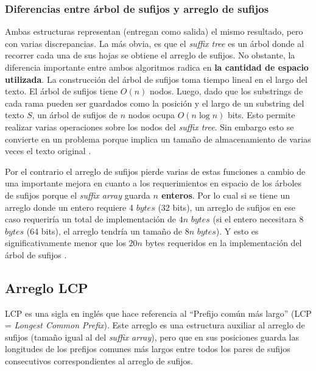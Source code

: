 \subsubsection*{Diferencias entre árbol de sufijos y arreglo de sufijos}

Ambas estructuras representan (entregan como salida) el mismo resultado, pero con varias discrepancias. La más obvia, es que el \textit{suffix tree} es un árbol donde al recorrer cada una de sus hojas se obtiene el arreglo de sufijos. No obstante, la diferencia importante entre ambos algoritmos radica en \textbf{la cantidad de espacio utilizada}. La construcción del árbol de sufijos toma tiempo lineal en el largo del texto. El árbol de sufijos tiene $O(n)$ nodos. Luego, dado que los substrings de cada rama pueden ser guardados como la posición y el largo de un substring del texto $S$, un árbol de sufijos de $n$ nodos ocupa $O(n \log n)$ bits. Esto permite realizar varias operaciones sobre los nodos del \textit{suffix tree}. Sin embargo esto se convierte en un problema porque implica un tamaño de almacenamiento de varias veces el texto original \cite{abeliuk}. 

Por el contrario el arreglo de sufijos pierde varias de estas funciones a cambio de una importante mejora en cuanto a los requerimientos en espacio de los árboles de sufijos porque el \textit{suffix array} guarda \textbf{$n$ enteros}. Por lo cual si se tiene un arreglo donde un entero requiere 4 $bytes$ (32 bits), un arreglo de sufijos en ese caso requeriría un total de implementación de $4n$ $bytes$ (si el entero necesitara 8 $bytes$ (64 bits), el arreglo tendría un tamaño de $8n$ $bytes$). Y esto es significativamente menor que los $20n$ bytes requeridos en la implementación del árbol de sufijos \cite{kurtz}.

\subsection{Arreglo LCP}

LCP es una sigla en inglés que hace referencia al ``Prefijo común más largo'' (LCP = \textit{Longest Common Prefix}). Este arreglo es una estructura auxiliar al arreglo de sufijos (tamaño igual al del \textit{suffix array}), pero que en sus posiciones guarda las longitudes de los prefijos comunes más largos entre todos los pares de sufijos consecutivos correspondientes al arreglo de sufijos. 

